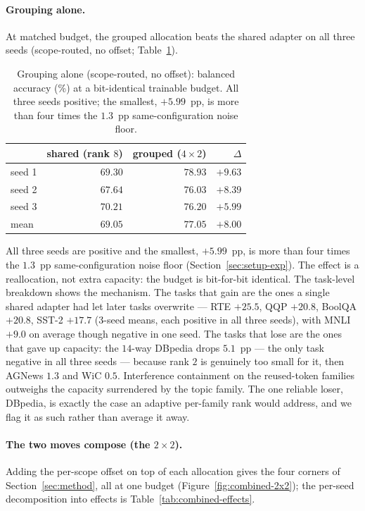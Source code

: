 \paragraph{Grouping alone.}
At matched budget, the grouped allocation beats the shared adapter on all three
seeds (scope-routed, no offset; Table~\ref{tab:grouping-alone}).

\begin{table}[t]
\centering
\small
\caption{Grouping alone (scope-routed, no offset): balanced accuracy (\%) at a
bit-identical trainable budget. All three seeds positive; the smallest, $+5.99$~pp,
is more than four times the $1.3$~pp same-configuration noise floor.}
\label{tab:grouping-alone}
\begin{tabular}{lrrr}
\toprule
 & shared (rank $8$) & grouped ($4{\times}2$) & $\Delta$ \\
\midrule
seed 1 & $69.30$ & $78.93$ & $+9.63$ \\
seed 2 & $67.64$ & $76.03$ & $+8.39$ \\
seed 3 & $70.21$ & $76.20$ & $+5.99$ \\
\midrule
mean   & $69.05$ & $77.05$ & $\mathbf{+8.00}$ \\
\bottomrule
\end{tabular}
\end{table}

\noindent All three seeds are positive and the smallest, $+5.99$~pp, is more than four
times the $1.3$~pp same-configuration noise floor (Section~\ref{sec:setup-exp}). The
effect is a reallocation, not extra capacity: the budget is bit-for-bit identical.
The task-level breakdown shows the mechanism. The tasks that gain are the ones a
single shared adapter had let later tasks overwrite --- RTE $+25.5$, QQP $+20.8$,
BoolQA $+20.8$, SST-2 $+17.7$ (3-seed means, each positive in all three seeds), with
MNLI $+9.0$ on average though negative in one seed. The tasks that lose are the ones
that gave up capacity: the $14$-way DBpedia drops $5.1$~pp --- the only task negative
in all three seeds --- because rank $2$ is genuinely too small for it, then AGNews
$1.3$ and WiC $0.5$. Interference containment on the reused-token families outweighs
the capacity surrendered by the topic family. The one reliable loser, DBpedia, is
exactly the case an adaptive per-family rank would address, and we flag it as such
rather than average it away.

\paragraph{The two moves compose (the $2\times2$).}
Adding the per-scope offset on top of each allocation gives the four corners of
Section~\ref{sec:method}, all at one budget (Figure~\ref{fig:combined-2x2}); the
per-seed decomposition into effects is Table~\ref{tab:combined-effects}.

